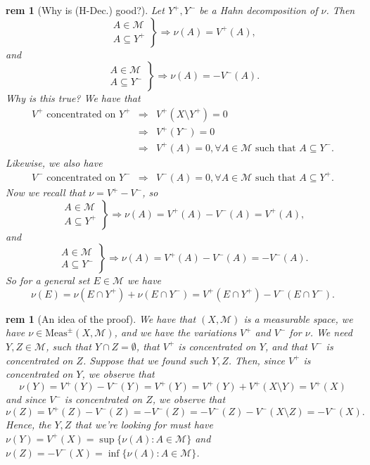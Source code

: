 \documentclass[letterpaper, 12pt]{article}
\newcommand{\fin}{\qquad \quad \hfill \framebox[1.75mm][l]{\,}}
\newcommand{\cM}{\mathcal{M}}
\newcommand{\Meas}{\mathrm{Meas}}
\theoremstyle{stdthm}
\theoremstyle{stddef}
\newtheorem{rem}[thm]{rem} %
\theoremstyle{stdnonum}
\theoremstyle{stdqands}
\theoremstyle{stdbold}
\begin{document}
\begin{rem} [Why is (H-Dec.) good?] Let $Y^+,Y^-$ be a Hahn decomposition of $\nu$. Then
\[
\left.
\begin{array}{c}
A\in\cM \\
A\subseteq Y^+
\end{array}
\right\}
\Longrightarrow
\nu(A) = V^+(A),
\]
and
\[
\left.
\begin{array}{c}
A\in\cM \\
A\subseteq Y^-
\end{array}
\right\}
\Longrightarrow
\nu(A) = -V^-(A).
\]
Why is this true? We have that
\begin{eqnarray*}
V^+\mbox{ concentrated on } Y^+ &\Longrightarrow& V^+(X\setminus Y^+) = 0\\
&\Longrightarrow& V^+(Y^-) = 0\\
&\Longrightarrow& V^+(A) = 0, \forall A\in\cM \mbox{ such that } A\subseteq Y^-.
\end{eqnarray*}
Likewise, we also have
\begin{eqnarray*}
V^-\mbox{ concentrated on } Y^- &\Longrightarrow& V^-(A) = 0, \forall A\in\cM \mbox{ such that } A\subseteq Y^+.
\end{eqnarray*}
Now we recall that $\nu = V^+-V^-$, so
\[
\left.
\begin{array}{c}
A\in\cM \\
A\subseteq Y^+
\end{array}
\right\}
\Longrightarrow
\nu(A) = V^+(A)-V^-(A) = V^+(A),
\]
and
\[
\left.
\begin{array}{c}
A\in\cM \\
A\subseteq Y^-
\end{array}
\right\}
\Longrightarrow
\nu(A) = V^+(A)-V^-(A) = -V^-(A).
\]
So for a general set $E\in \cM$ we have 
\[
\nu(E) = \nu(E\cap Y^+) + \nu (E\cap Y^-) = V^+(E\cap Y^+) - V^- (E\cap Y^-).
\]
\end{rem}

\begin{rem} [An idea of the proof]
We have that $(X,\cM)$ is a measurable space, we have $\nu\in\Meas^\pm(X,\cM)$, and we have the variations $V^+$ and $V^-$ for $\nu$. We need $Y,Z\in\cM$, such that $Y\cap Z = \emptyset$, that $V^+$ is concentrated on $Y$, and that $V^-$ is concentrated on $Z$. Suppose that we found such $Y,Z$. Then, since $V^+$ is concentrated on $Y$, we observe that
\[
\nu(Y) = V^+(Y) - V^-(Y) = V^+(Y) = V^+(Y) + V^+(X\setminus Y) = V^+(X)
\]
and since $V^-$ is concentrated on $Z$, we observe that
\[
\nu(Z) = V^+(Z) - V^-(Z) = -V^-(Z) = -V^-(Z) - V^-(X\setminus Z) = -V^-(X).
\]
Hence, the $Y,Z$ that we're looking for must have $\nu(Y) = V^+(X) = \sup\{\nu(A):A\in\cM\}$ and $\nu(Z) = -V^-(X) = \inf\{\nu(A):A\in\cM\}$.
\end{rem}
\end{document}
